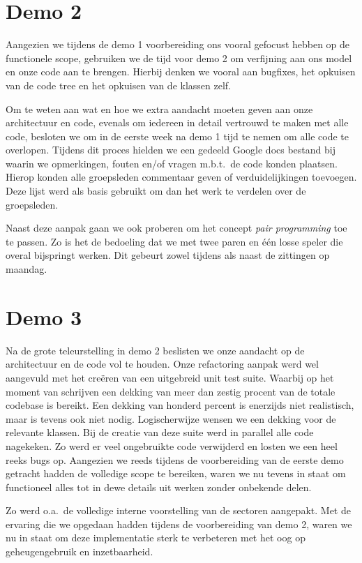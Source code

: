 \documentclass[12pt,a4paper]{report}
\begin{document}
\section{Demo 2}

Aangezien we tijdens de demo 1 voorbereiding ons vooral gefocust hebben op de functionele scope, gebruiken we de tijd voor demo 2 om verfijning aan ons model en onze code aan te brengen. Hierbij denken we vooral aan bugfixes, het opkuisen van de code tree en het opkuisen van de klassen zelf.

Om te weten aan wat en hoe we extra aandacht moeten geven aan onze architectuur en code, evenals om iedereen in detail vertrouwd te maken met alle code, besloten we om in de eerste week na demo 1 tijd te nemen om alle code te overlopen. Tijdens dit proces hielden we een gedeeld Google docs bestand bij waarin we opmerkingen, fouten en/of vragen m.b.t.\ de code konden plaatsen. Hierop konden alle groepsleden commentaar geven of verduidelijkingen toevoegen. Deze lijst werd als basis gebruikt om dan het werk te verdelen over de groepsleden.

Naast deze aanpak gaan we ook proberen om het concept \emph{pair programming} toe te passen. Zo is het de bedoeling dat we met twee paren en \'e\'en losse speler die overal bijspringt werken. Dit gebeurt zowel tijdens als naast de zittingen op maandag.

\section{Demo 3}

Na de grote teleurstelling in demo 2 beslisten we onze aandacht op de architectuur en de code vol te houden. Onze refactoring aanpak werd wel aangevuld met het cre\"eren van een uitgebreid unit test suite. Waarbij op het moment van schrijven een dekking van meer dan zestig procent van de totale codebase is bereikt. Een dekking van honderd percent is enerzijds niet realistisch, maar is tevens ook niet nodig. Logischerwijze wensen we een dekking voor de relevante klassen. Bij de creatie van deze suite werd in parallel alle code nagekeken. Zo werd er veel ongebruikte code verwijderd en losten we een heel reeks bugs op. Aangezien we reeds tijdens de voorbereiding van de eerste demo getracht hadden de volledige scope te bereiken, waren we nu tevens in staat om functioneel alles tot in dewe  details uit werken zonder onbekende delen.

Zo werd o.a.\ de volledige interne voorstelling van de sectoren aangepakt. Met de ervaring die we opgedaan hadden tijdens de voorbereiding van demo 2, waren we nu in staat om deze implementatie sterk te verbeteren met het oog op geheugengebruik en inzetbaarheid.
\end{document}
